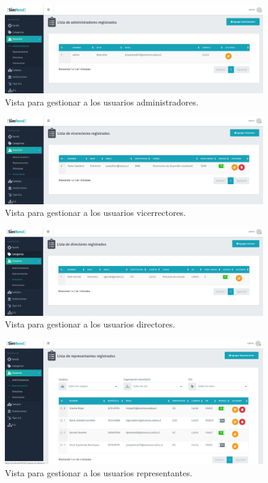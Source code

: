 \begin{figure}[h]
    \centering
    \includegraphics[width=1\textwidth]{Imagenes/CRUDAdministrador.PNG}
    \caption{\label{fig: CRUDAdministrador}Vista para gestionar a los usuarios administradores.}
\end{figure}

\begin{figure}[h]
    \centering
    \includegraphics[width=1\textwidth]{Imagenes/CRUDVicerrectores.PNG}
    \caption{\label{fig: CRUDVicerrectores}Vista para gestionar a los usuarios vicerrectores.}
\end{figure}

\begin{figure}[h]
    \centering
    \includegraphics[width=1\textwidth]{Imagenes/CRUDDirectores.PNG}
    \caption{\label{fig: CRUDDirectores}Vista para gestionar a los usuarios directores.}
\end{figure}

\begin{figure}[h]
    \centering
    \includegraphics[width=1\textwidth]{Imagenes/CRUDRepresentante.PNG}
    \caption{\label{fig: CRUDRepresentante}Vista para gestionar a los usuarios representantes.}
\end{figure}

